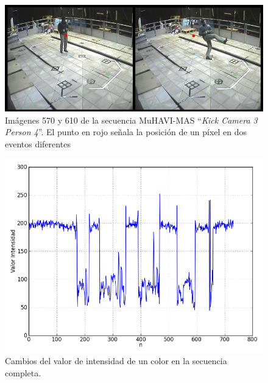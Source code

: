 \begin{figure}[h!]
  \centering
      \includegraphics[scale=0.5]{img/figura_3_1}
  \caption[Imágenes 570, 610 de secuencia ``\textit{Kick Camera 3 Person 4}'']{Imágenes 570 y 610 de la secuencia MuHAVI-MAS ``\textit{Kick Camera 3 Person 4}''. El punto en rojo señala la posición de un píxel en dos eventos diferentes}
\label{posicion_340_160}
\end{figure}

\begin{figure}[h!]
  \centering
      \includegraphics[scale=0.5]{img/figura_3_2}
  \caption[Cambios de intensidad en el tiempo del valor de un pixel ]{Cambios del valor de intensidad de un color en la secuencia completa.}
\label{intensidad_340_160}
\end{figure}


